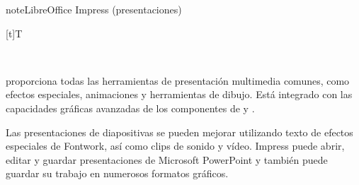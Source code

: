 \documentclass[letterpaper,10pt,spanish]{sphinxmanual}
\let\sphinxpxdimen\pdfpxdimen\else\newdimen\sphinxpxdimen
\begin{document}
\begin{sphinxadmonition}{note}{LibreOffice Impress (presentaciones)}


\begin{savenotes}\sphinxattablestart
\sphinxthistablewithglobalstyle
\centering
\begin{tabulary}{\linewidth}[t]{T}
\sphinxtoprule
\sphinxtableatstartofbodyhook

\begin{sphinxfigure-in-table}
\centering
\capstart
\noindent\sphinxincludegraphics[width=270\sphinxpxdimen]{{image16}.png}
\label{\detokenize{1_guias/10ofimatica/G1012:id56}}\end{sphinxfigure-in-table}\relax
\\
\sphinxbottomrule
\end{tabulary}
\sphinxtableafterendhook\par
\sphinxattableend\end{savenotes}

\sphinxAtStartPar
{} proporciona todas las herramientas de presentación multimedia comunes, como efectos especiales, animaciones y herramientas de dibujo. Está integrado con las capacidades gráficas avanzadas de los componentes de  y .

\sphinxAtStartPar
Las presentaciones de diapositivas se pueden mejorar utilizando texto de efectos especiales de Fontwork, así como clips de sonido y vídeo. Impress puede abrir, editar y guardar presentaciones de Microsoft PowerPoint y también puede guardar su trabajo en numerosos formatos gráficos.
\end{sphinxadmonition}
\end{document}
